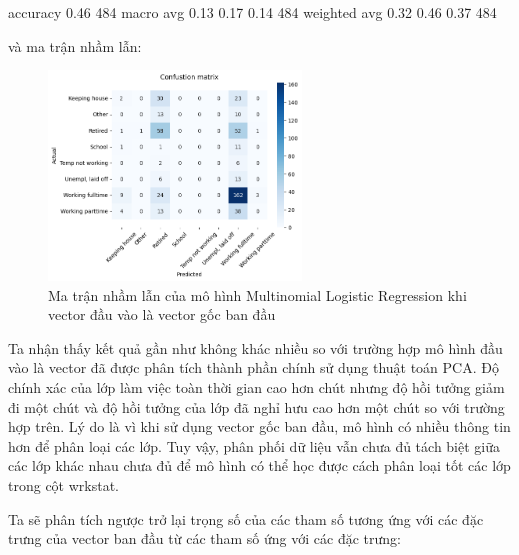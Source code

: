 \begin{enumerate}[label=(\alph*)]
\begin{python}
        accuracy                           0.46       484
       macro avg       0.13      0.17      0.14       484
    weighted avg       0.32      0.46      0.37       484
    \end{python}

    và ma trận nhầm lẫn:

    \begin{figure}[H]
        \centering
        \includegraphics[width=0.6\textwidth]{figures/Thanh/Models/Logistic/With_null_models_confusion_matrix_Logistic_original_features.png}
        \caption{Ma trận nhầm lẫn của mô hình Multinomial Logistic Regression khi vector đầu vào là vector gốc ban đầu}
        \label{fig:With_null_models_confusion_matrix_Logistic_original_features}
    \end{figure}

    Ta nhận thấy kết quả gần như không khác nhiều so với trường hợp mô hình đầu vào là vector đã được phân tích thành phần chính sử dụng thuật toán PCA.
    Độ chính xác của lớp làm việc toàn thời gian cao hơn chút nhưng độ hồi tưởng giảm đi một chút và độ hồi tưởng của lớp đã nghỉ hưu cao hơn một chút so với trường hợp trên.
    Lý do là vì khi sử dụng vector gốc ban đầu, mô hình có nhiều thông tin hơn để phân loại các lớp.
    Tuy vậy, phân phối dữ liệu vẫn chưa đủ tách biệt giữa các lớp khác nhau chưa đủ để mô hình có thể học được cách phân loại tốt các lớp trong cột wrkstat.

    Ta sẽ phân tích ngược trở lại trọng số của các tham số tương ứng với các đặc trưng của vector ban đầu từ các tham số ứng với các đặc trưng:


\end{enumerate}
